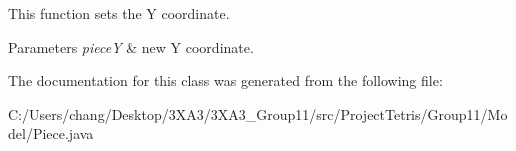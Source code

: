 This function sets the Y coordinate. 


\begin{DoxyParams}{Parameters}
{\em pieceY} & new Y coordinate. \\
\hline
\end{DoxyParams}


The documentation for this class was generated from the following file\+:\begin{DoxyCompactItemize}
\item 
C\+:/\+Users/chang/\+Desktop/3\+X\+A3/3\+X\+A3\+\_\+\+Group11/src/\+Project\+Tetris/\+Group11/\+Model/Piece.\+java\end{DoxyCompactItemize}
